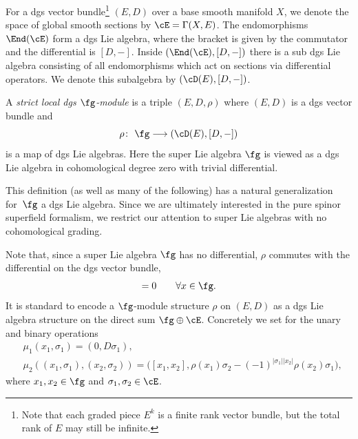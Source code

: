 For a dgs vector bundle\footnote{Note that each graded piece $E^k$ is a finite rank vector bundle, but the total rank of $E$ may still be infinite.} $(E,D)$ over a base smooth manifold $X$, we denote the space of global smooth sections by $\cE = \Gamma(X,E)$. The endomorphisms $\End(\cE)$ form a dgs Lie algebra, where the bracket is given by the commutator and the differential is $[D,-]$. Inside $(\End(\cE), [D,-])$ there is a sub dgs Lie algebra consisting of all endomorphisms which act on sections via differential operators. We denote this subalgebra by $(\cD(E), [D,-])$.
\begin{dfn}
	A \emph{strict local dgs $\fg$-module} is a triple $(E,D,\rho)$ where $(E,D)$ is a dgs vector bundle and
	\begin{equation*}
	\rho \colon \ \fg \longrightarrow (\cD(E) , [D,-] )
	\end{equation*}
	is a map of dgs Lie algebras. Here the super Lie algebra $\fg$ is viewed as a dgs Lie algebra in cohomological degree zero with trivial differential.
\end{dfn}
\begin{rmk}
	This definition (as well as many of the following) has a natural generalization for~$\fg$ a dgs Lie algebra. Since we are ultimately interested in the pure spinor superfield formalism, we restrict our attention to super Lie algebras with no cohomological grading.
\end{rmk}
Note that, since a super Lie algebra $\fg$ has no differential, $\rho$ commutes with the differential on the dgs vector bundle,
\begin{equation*}
[D,\rho(x)] = 0 \qquad \forall x \in \fg .
\end{equation*}
It is standard to encode a $\fg$-module structure $\rho$ on $(E,D)$ as a dgs Lie algebra structure on the direct sum $\fg \oplus \cE$. Concretely we set for the unary and binary operations
\begin{align}
&\mu_1(x_1,\sigma_1) = (0, D\sigma_1),\nonumber \\
&\mu_2((x_1,\sigma_1),(x_2,\sigma_2)) = \big([x_1,x_2] , \rho(x_1)\sigma_2 - (-1)^{|\sigma_1| |x_2|} \rho(x_2)\sigma_1 \big) ,\label{eq: lie structure on sum}
\end{align}
where $x_1,x_2 \in \fg$ and $\sigma_1,\sigma_2 \in \cE$.

